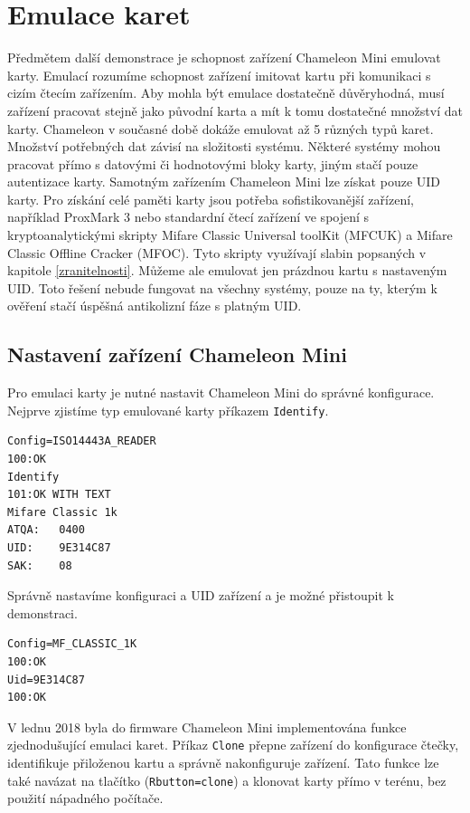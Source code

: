 \section{Emulace karet}
Předmětem další demonstrace je schopnost zařízení Chameleon Mini emulovat karty. Emulací rozumíme schopnost zařízení imitovat kartu při komunikaci s cizím čtecím zařízením. Aby mohla být emulace dostatečně důvěryhodná, musí zařízení pracovat stejně jako původní karta a mít k tomu dostatečné množství dat karty. Chameleon v současné době dokáže emulovat až 5 různých typů karet. Množství potřebných dat závisí na složitosti systému. Některé systémy mohou pracovat přímo s datovými či hodnotovými bloky karty, jiným stačí pouze autentizace karty. Samotným zařízením Chameleon Mini lze získat pouze UID karty. Pro získání celé paměti karty jsou potřeba sofistikovanější zařízení, například ProxMark 3 nebo standardní čtecí zařízení ve spojení s kryptoanalytickými skripty Mifare Classic Universal toolKit (MFCUK) a Mifare Classic Offline Cracker (MFOC)\cite{RelayUtokBP}. Tyto skripty využívají slabin popsaných v kapitole \ref{zranitelnosti}.
Můžeme ale emulovat jen prázdnou kartu s nastaveným UID. Toto řešení nebude fungovat na všechny systémy, pouze na ty, kterým k ověření stačí úspěšná antikolizní fáze s platným UID.\par

\subsection{Nastavení zařízení Chameleon Mini}
Pro emulaci karty je nutné nastavit Chameleon Mini do správné konfigurace. Nejprve zjistíme typ emulované karty příkazem \verb|Identify|.

\begin{lstlisting}[caption=Záznam postupu identifikace karty, label={ChameleonIdentify}]
Config=ISO14443A_READER
100:OK
Identify
101:OK WITH TEXT
Mifare Classic 1k
ATQA:   0400
UID:    9E314C87
SAK:    08
\end{lstlisting}

Správně nastavíme konfiguraci a UID zařízení a je možné přistoupit k demonstraci.

\begin{lstlisting}[caption=Záznam nastavení emulace karty, label={ChameleonSetting}]
Config=MF_CLASSIC_1K
100:OK
Uid=9E314C87
100:OK
\end{lstlisting}

V lednu 2018 byla do firmware Chameleon Mini implementována funkce zjednodušující emulaci karet. Příkaz \verb|Clone| přepne zařízení do konfigurace čtečky, identifikuje přiloženou kartu a správně nakonfiguruje zařízení. Tato funkce lze také navázat na tlačítko (\verb|Rbutton=clone|) a klonovat karty přímo v terénu, bez použití nápadného počítače.

